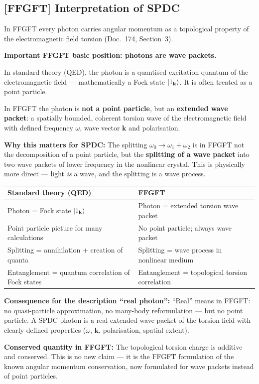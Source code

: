 \subsection{[FFGFT] Interpretation of SPDC}

\begin{foundation}
In FFGFT every photon carries angular momentum as a
topological property of the electromagnetic field torsion
(Doc.~174, Section~3).

\textbf{Important FFGFT basic position: photons are wave packets.}

In standard theory (QED), the photon is a quantised
excitation quantum of the electromagnetic field --- mathematically
a Fock state $\left|1_\mathbf{k}\right\rangle$.
It is often treated as a point particle.

In FFGFT the photon is \textbf{not a point particle},
but an \textbf{extended wave packet}:
a spatially bounded, coherent torsion wave of the
electromagnetic field with defined frequency $\omega$,
wave vector $\mathbf{k}$ and polarisation.

\textbf{Why this matters for SPDC:}
The splitting $\omega_0 \to \omega_1 + \omega_2$ is
in FFGFT not the decomposition of a point particle,
but the \textbf{splitting of a wave packet}
into two wave packets of lower frequency in the nonlinear crystal.
This is physically more direct --- light \emph{is} a wave,
and the splitting is a wave process.

\begin{center}
\begin{tabular}{p{5cm}p{6cm}}
\toprule
\textbf{Standard theory (QED)} & \textbf{FFGFT} \\
\midrule
Photon = Fock state $\left|1_\mathbf{k}\right\rangle$ &
  Photon = extended torsion wave packet \\
Point particle picture for many calculations &
  No point particle; always wave packet \\
Splitting = annihilation + creation of quanta &
  Splitting = wave process in nonlinear medium \\
Entanglement = quantum correlation of Fock states &
  Entanglement = topological torsion correlation \\
\bottomrule
\end{tabular}
\end{center}

\textbf{Consequence for the description ``real photon'':}
``Real'' means in FFGFT: no quasi-particle approximation,
no many-body reformulation --- but no point particle.
A SPDC photon is a real extended wave packet
of the torsion field with clearly defined properties
($\omega$, $\mathbf{k}$, polarisation, spatial extent).

\textbf{Conserved quantity in FFGFT:}
The topological torsion charge is additive and conserved.
This is no new claim --- it is the FFGFT formulation
of the known angular momentum conservation, now formulated
for wave packets instead of point particles.
\end{foundation}

